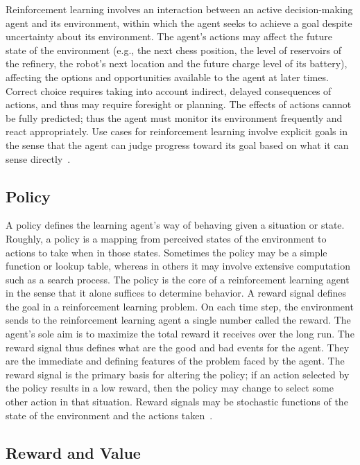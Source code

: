 \documentclass[letterpaper, 10 pt]{IEEEconf}
\begin{document}
Reinforcement learning involves an interaction between an active
decision-making agent and its environment, within
which the agent seeks to achieve a goal despite uncertainty about its
environment. The agent’s actions may affect the future state of the
environment (e.g., the next chess position, the level of reservoirs of
the refinery, the robot’s next location and the future charge level of
its battery), affecting the options and opportunities available to the
agent at later times. Correct choice requires taking into account
indirect, delayed consequences of actions, and thus may require
foresight or planning. The effects of actions cannot be fully
predicted; thus the agent must monitor its environment frequently and
react appropriately. Use cases for reinforcement learning involve
explicit goals in the sense that the agent can judge progress toward
its goal based on what it can sense directly~\cite{sutton2018reinforcement}.

\subsection{Policy}

A policy defines the learning agent’s way of behaving given a
situation or state. Roughly, a policy is a mapping from perceived
states of the environment to actions to take when in those
states. Sometimes the policy may be a simple function or lookup table,
whereas in others it may involve extensive computation such as a
search process. The policy is the core of a reinforcement learning
agent in the sense that it alone suffices to determine behavior.  A
reward signal defines the goal in a reinforcement learning problem. On
each time step, the environment sends to the reinforcement learning
agent a single number called the reward. The agent’s sole aim is to
maximize the total reward it receives over the long run. The reward
signal thus defines what are the good and bad events for the
agent. They are the immediate and defining features of the problem
faced by the agent. The reward signal is the primary basis for
altering the policy; if an action selected by the policy results in a
low reward, then the policy may change to select some other action in
that situation. Reward signals may be stochastic functions of the
state of the environment and the actions taken~\cite{sutton2018reinforcement}.

\subsection{Reward and Value}
\end{document}
